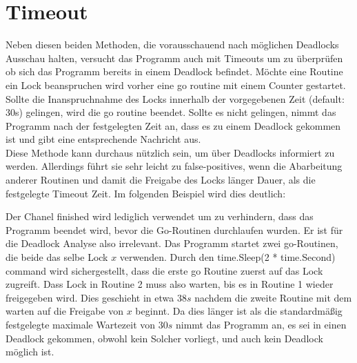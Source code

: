 \section{Timeout}
Neben diesen beiden Methoden, die vorausschauend nach möglichen Deadlocks 
Ausschau halten, versucht das Programm auch mit Timeouts um zu überprüfen ob 
sich das Programm bereits in einem Deadlock befindet. Möchte eine Routine ein 
Lock beanspruchen wird vorher eine go routine mit einem Counter gestartet.
Sollte die Inanspruchnahme des Locks innerhalb der vorgegebenen Zeit 
(default: 30s) gelingen, wird die go routine beendet. Sollte es nicht gelingen,
nimmt das Programm nach der festgelegten Zeit an, dass es zu einem Deadlock 
gekommen ist und gibt eine entsprechende Nachricht aus.\\
Diese Methode kann
durchaus nützlich sein, um über Deadlocks informiert zu werden. Allerdings führt
sie sehr leicht zu false-positives, wenn die Abarbeitung anderer Routinen und 
damit die Freigabe des Locks länger Dauer, als die festgelegte Timeout Zeit.
Im folgenden Beispiel wird dies deutlich:
\begin{figure}[H]
    
\end{figure}
Der Chanel finished wird lediglich verwendet um zu verhindern, dass das Programm 
beendet wird, bevor die Go-Routinen durchlaufen wurden. Er ist für die Deadlock
Analyse also irrelevant. Das Programm startet zwei go-Routinen, die beide das 
selbe Lock $x$ verwenden. Durch den time.Sleep(2 * time.Second) command wird 
sichergestellt, dass die erste go Routine zuerst auf das Lock zugreift. 
Dass Lock in Routine 2 muss also warten, bis es in Routine 1 wieder freigegeben
wird. Dies geschieht in etwa $38 s$ nachdem die zweite Routine mit dem warten 
auf die Freigabe von $x$ beginnt. Da dies länger ist als die standardmäßig
festgelegte maximale Wartezeit von $30 s$ nimmt das Programm an, es sei in einen 
Deadlock gekommen, obwohl kein Solcher vorliegt, und auch kein Deadlock möglich 
ist.

